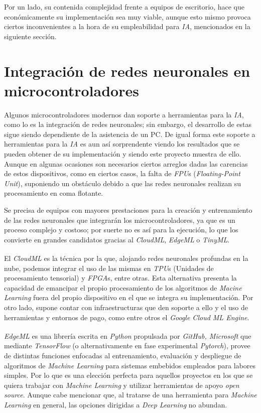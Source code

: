 Por un lado, su contenida complejidad frente a equipos de escritorio, hace que
económicamente su implementación sea muy viable, aunque esto mismo provoca
ciertos inconvenientes a la hora de su empleabilidad para \textit{IA}, mencionados
en la siguiente sección.


\section{Integración de redes neuronales en microcontroladores\label{integRNenμC}}
Algunos microcontroladores modernos dan soporte a herramientas para la \textit{IA},
como lo es la integración de redes neuronales;
sin embargo, el desarrollo de estas sigue siendo dependiente de la asistencia de un
PC. De igual forma este soporte a herramientas para la \textit{IA} es aun así
sorprendente viendo los resultados que se pueden obtener de su implementación y
siendo este proyecto muestra de ello.
Aunque en algunas ocasiones son necesarios ciertos arreglos dadas las carencias
de estos dispositivos, como en ciertos casos, la falta de \textit{FPU}s
(\textit{Floating-Point Unit}), suponiendo un obstáculo debido a que las redes
neuronales realizan su procesamiento en coma flotante.

Se precisa de equipos con mayores prestaciones para la
creación y entrenamiento de las redes neuronales que integrarán los microcontroladores,
ya que es un proceso complejo y costoso;
por suerte no es así para la ejecución, lo que los convierte en grandes candidatos
gracias al \textit{CloudML}, \textit{EdgeML} o \textit{TinyML}.

El \textit{CloudML}\textsuperscript{\cite{CloudMl}} es la técnica por la que, alojando redes neuronales profundas
en la nube, podemos integrar el uso de las mismas en \textit{TPU}s (Unidades de procesamiento
tensorial) y \textit{FPGA}s, entre otras. Esta alternativa presenta la capacidad
de emancipar el propio procesamiento de los algoritmos de \textit{Macine Learning}
fuera del propio dispositivo en el que se integra su implementación. Por otro lado,
supone contar con infraestructuras que den soporte a ello y el uso de herramientas
y entornos de pago, como entre otros el \textit{Google Cloud ML Engine}.

\textit{EdgeML}\textsuperscript{\cite{EdgeMl}} es una librería escrita en \textit{Python} propulsada por
\textit{GitHub, Microsoft} que mediante \textit{TensorFlow} (o alternativamente en
fase experimental \textit{Pytorch}), provee de distintas funciones enfocadas al
entrenamiento, evaluación y despliegue de algoritmos de
\textit{Machine Learning} para sistemas embebidos empleados para labores simples.
Por lo que es una elección perfecta para aquellos proyectos en los que se quiera
trabajar con \textit{Machine Learning} y utilizar herramientas de apoyo
\textit{open source}. Aunque cabe mencionar que, al tratarse de una herramienta
para \textit{Machine Learning} en general, las opciones dirigidas a
\textit{Deep Learning} no abundan.


